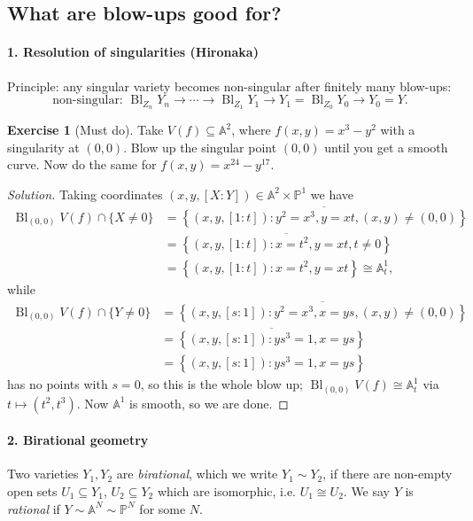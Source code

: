 \documentclass{article}
\theoremstyle{definition}
\newtheorem*{exercise}{Exercise}
\DeclareMathOperator{\Bl}{Bl}
\newcommand{\closure}[1]{\overline{#1}}
\renewcommand{\P}{\mathbb{P}}
\newcommand{\A}{\mathbb{A}}
\begin{document}
\subsection*{What are blow-ups good for?}

\paragraph{1. Resolution of singularities (Hironaka)} Principle: any singular
variety becomes non-singular after finitely many blow-ups:
\begin{equation*}
    \text{non-singular: $\Bl_{Z_n}Y_n$} \to \cdots
        \to \Bl_{Z_1}Y_1 \to Y_1 = \Bl_{Z_0}Y_0 \to Y_0 = Y.
\end{equation*}

\begin{exercise}[Must do]
    Take $V(f)\subseteq\A^2$, where $f(x,y)=x^3-y^2$ with a singularity at
    $(0,0)$. Blow up the singular point $(0,0)$ until you get a smooth curve.
    Now do the same for $f(x,y)=x^{24}-y^{17}$.
\end{exercise}

\begin{proof}[Solution]
    Taking coordinates $(x,y,[X:Y])\in\A^2\times\P^1$ we have
    \begin{align*}
        \Bl_{(0,0)}V(f) \cap \{X\ne0\}
            &= \closure{\left\{(x,y,[1:t]):y^2=x^3,y=xt,(x,y)\ne(0,0)\right\}} \\
            &= \closure{\left\{(x,y,[1:t]):x=t^2,y=xt,t\ne0\right\}} \\
            &= \left\{(x,y,[1:t]):x=t^2,y=xt\right\} \cong \A^1_t,
    \end{align*}
    while
    \begin{align*}
        \Bl_{(0,0)}V(f) \cap \{Y\ne0\}
            &= \closure{\left\{(x,y,[s:1]):y^2=x^3,x=ys,(x,y)\ne(0,0)\right\}} \\
            &= \closure{\left\{(x,y,[s:1]):ys^3=1,x=ys\right\}} \\
            &= \left\{(x,y,[s:1]):ys^3=1,x=ys\right\}
    \end{align*}
    has no points with $s=0$, so this is the whole blow up;
    $\Bl_{(0,0)}V(f)\cong\A^1_t$ via $t\mapsto(t^2,t^3)$. Now $\A^1$ is smooth,
    so we are done.
\end{proof}

\paragraph{2. Birational geometry} Two varieties $Y_1,Y_2$ are
\emph{birational}, which we write $Y_1\sim Y_2$, if there are
non-empty open sets $U_1\subseteq Y_1$, $U_2\subseteq Y_2$ which are isomorphic,
i.e. $U_1\cong U_2$. We say $Y$ is \emph{rational} if
$Y\sim\A^N\sim\P^N$ for some $N$.
\end{document}
